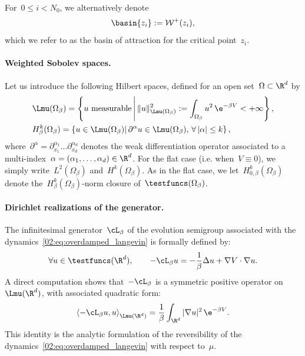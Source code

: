     For~$0\leq i < N_0$, we alternatively denote
    \begin{equation}
        \label{02:eq:basin}
        \basin{z_i} := \mathcal W^+(z_i),
    \end{equation}
    which we refer to as the basin of attraction for the critical point~$z_i$.
    \paragraph{Weighted Sobolev spaces.}
    Let us introduce the following Hilbert spaces, defined for an open set~$\Omega\subset \R^d$ by
    \begin{equation}
        \label{02:eq:sobolev_spaces}
        \begin{aligned}
        &\Lmu(\Omega_\beta) = \left\{u\text{ measurable}\,\middle|\,\|u\|^2_{\Lmu(\Omega_\beta)} :=\int_{\Omega_\beta} u^2 \,\e^{-\beta V} < +\infty\right\},\\
         &H^{k}_\beta(\Omega_\beta) = \left\{u\in \Lmu(\Omega_\beta)\middle|\,\partial^{\alpha}u\in \Lmu(\Omega_\beta),\,\forall\, |\alpha|\leq k\right\},
        \end{aligned}
    \end{equation}
    where~$\partial^\alpha = \partial_{x_1}^{\alpha_1}\dots\partial_{x_d}^{\alpha_d}$ denotes the weak differentiation operator associated to a multi-index~$\alpha = (\alpha_1,\dots,\alpha_d)\in \R^d$. For the flat case (i.e. when~$V\equiv 0$), we simply write~$L^2(\Omega_\beta)$ and~$H^k(\Omega_\beta)$. As in the flat case, we let~$H_{0,\beta}^k(\Omega_\beta)$ denote the~$H_\beta^k(\Omega_\beta)$-norm closure of~$\testfuncs(\Omega_\beta)$. 

    \paragraph{Dirichlet realizations of the generator.}
    The infinitesimal generator~$\cL_\beta$ of the evolution semigroup associated with the dynamics~\eqref{02:eq:overdamped_langevin} is formally defined by:
    \begin{equation}
        \label{02:eq:generator}
        \forall u \in \testfuncs(\R^d),\qquad-\cL_\beta u = - \frac1\beta \Delta u+\nabla V \cdot \nabla u .
    \end{equation}
    A direct computation shows that~$-\cL_\beta$ is a symmetric positive operator on~$\Lmu(\R^d)$, with associated quadratic form:
    \begin{equation}
        \label{02:eq:quadratic_form_generator}
        \left\langle -\cL_\beta u, u \right\rangle_{\Lmu(\R^d)} = \frac1\beta \int_{\R^d} |\nabla u|^2\,\e^{-\beta V}.
    \end{equation}
    This identity is the analytic formulation of the reversibility of the dynamics~\eqref{02:eq:overdamped_langevin} with respect to~$\mu$.

